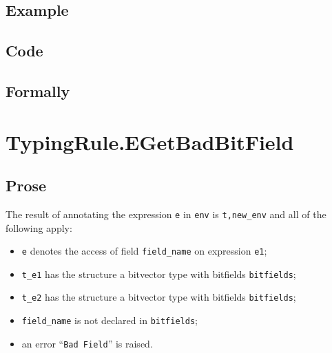 \documentclass{book}
\begin{document}
  \subsection{Example}

  \subsection{Code}

\begin{emptyformal}
    \subsection{Formally}
\end{emptyformal}


\section{TypingRule.EGetBadBitField \label{sec:TypingRule.EGetBadBitField}}

  \subsection{Prose}
  The result of annotating the expression \texttt{e} in \texttt{env} is
\texttt{t,new\_env} and all of the following apply:
  \begin{itemize}
  \item \texttt{e} denotes the access of field \texttt{field\_name} on expression \texttt{e1};
  \item \texttt{t\_e1} has the structure a bitvector type with bitfields \texttt{bitfields};
  \item \texttt{t\_e2} has the structure a bitvector type with bitfields \texttt{bitfields};
  \item \texttt{field\_name} is not declared in \texttt{bitfields};
  \item an error ``\texttt{Bad Field}'' is raised.
  \end{itemize}
\end{document}

